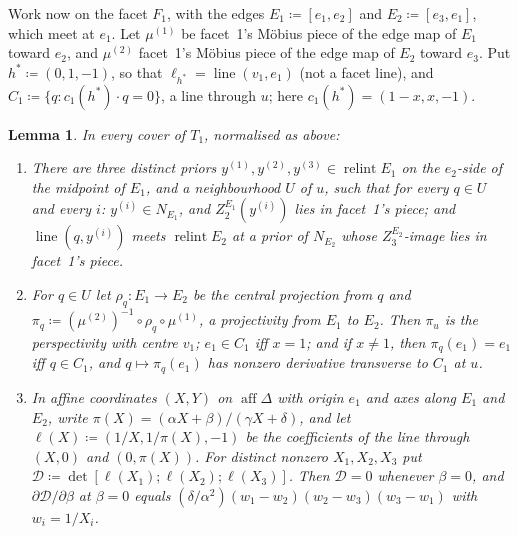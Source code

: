 \documentclass[11pt]{article}
\newtheorem{lemma}[theorem]{Lemma}
\theoremstyle{definition}
\theoremstyle{remark}
\newcommand{\relint}{\operatorname{relint}}
\newcommand{\aff}{\operatorname{aff}}
\newcommand{\lin}{\operatorname{line}}
\begin{document}
Work now on the facet $F_1$, with the edges $E_1\coloneqq[e_1,e_2]$ and $E_2\coloneqq[e_3,e_1]$, which meet at $e_1$. Let $\mu^{(1)}$ be facet~1's M\"obius piece of the edge map of $E_1$ toward $e_2$, and $\mu^{(2)}$ facet~1's M\"obius piece of the edge map of $E_2$ toward $e_3$. Put $h^*\coloneqq(0,1,-1)$, so that $\ell_{h^*}=\lin(v_1,e_1)$ (not a facet line), and $C_1\coloneqq\{q:c_1(h^*)\cdot q=0\}$, a line through $u$; here $c_1(h^*)=(1-x,x,-1)$.

\begin{lemma}\label{lem:window}
In every cover of $T_1$, normalised as above:
\begin{enumerate}[leftmargin=*,label=(\alph*)]
\item There are three distinct priors $y^{(1)},y^{(2)},y^{(3)}\in\relint E_1$ on the $e_2$-side of the midpoint of $E_1$, and a neighbourhood $U$ of $u$, such that for every $q\in U$ and every $i$: $y^{(i)}\in N_{E_1}$, and $Z^{E_1}_2(y^{(i)})$ lies in facet~1's piece; and $\lin(q,y^{(i)})$ meets $\relint E_2$ at a prior of $N_{E_2}$ whose $Z^{E_2}_3$-image lies in facet~1's piece.
\item For $q\in U$ let $\rho_q:E_1\to E_2$ be the central projection from $q$ and $\pi_q\coloneqq(\mu^{(2)})^{-1}\circ\rho_q\circ\mu^{(1)}$, a projectivity from $E_1$ to $E_2$. Then $\pi_u$ is the perspectivity with centre $v_1$; $e_1\in C_1$ iff $x=1$; and if $x\ne1$, then $\pi_q(e_1)=e_1$ iff $q\in C_1$, and $q\mapsto\pi_q(e_1)$ has nonzero derivative transverse to $C_1$ at $u$.
\item In affine coordinates $(X,Y)$ on $\aff\Delta$ with origin $e_1$ and axes along $E_1$ and $E_2$, write $\pi(X)=(\alpha X+\beta)/(\gamma X+\delta)$, and let $\ell(X)\coloneqq(1/X,1/\pi(X),-1)$ be the coefficients of the line through $(X,0)$ and $(0,\pi(X))$. For distinct nonzero $X_1,X_2,X_3$ put $\mathcal D\coloneqq\det[\ell(X_1);\ell(X_2);\ell(X_3)]$. Then $\mathcal D=0$ whenever $\beta=0$, and $\partial\mathcal D/\partial\beta$ at $\beta=0$ equals $(\delta/\alpha^2)(w_1-w_2)(w_2-w_3)(w_3-w_1)$ with $w_i=1/X_i$.
\end{enumerate}
\end{lemma}
\end{document}
